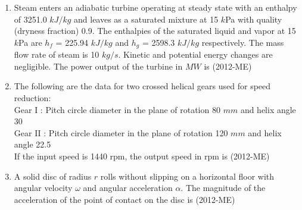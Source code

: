 \documentclass[journal,12pt,twocolumn]{IEEEtran}
\theoremstyle{remark}
\begin{document}
\begin{enumerate}
\item Steam enters an adiabatic turbine operating at steady state with an enthalpy of 3251.0 $kJ/kg$ and leaves as a saturated mixture at 15 $k$Pa with quality (dryness fraction) 0.9. The enthalpies of the saturated liquid and vapor at 15 $k$Pa are $h_f$ = 225.94 $kJ/kg$ and $h_g$ = 2598.3 $kJ/kg$ respectively. The mass flow rate of steam is 10 $kg/s$. Kinetic and potential energy changes are negligible. The power output of the turbine in $MW$ is \hfill{(2012-ME)} 
  \begin{enumerate}   
   \end{enumerate}


\item The following are the data for two crossed helical gears used for speed reduction:\\
Gear I : Pitch circle diameter in the plane of rotation 80 $mm$ and helix angle 30\degree \\
Gear II : Pitch circle diameter in the plane of rotation 120 $mm$ and helix angle 22.5\degree \\
If the input speed is 1440 rpm, the output speed in rpm is \hfill{(2012-ME)} 
                 \begin{enumerate}   
       \end{enumerate}


\item A solid disc of radius $r$ rolls without slipping on a horizontal floor with angular velocity $\omega$ and
angular acceleration $\alpha$. The magnitude of the acceleration of the point of contact on the disc is \hfill{(2012-ME)} 
                 \begin{enumerate}   
                         \end{enumerate}




\end{enumerate}
\end{document}
